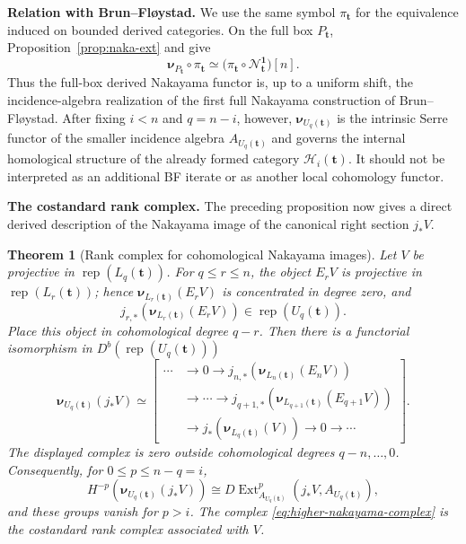 \documentclass[12pt,reqno]{amsart}
\newtheorem{theorem}{Theorem}[section]
\theoremstyle{definition}
\theoremstyle{remark}
\newcommand{\Rep}{\operatorname{rep}}
\newcommand{\Ext}{\operatorname{Ext}}
\begin{document}
\medskip\noindent\textbf{Relation with Brun--Fl\o ystad.}
We use the same symbol $\pi_{\mathbf t}$ for the equivalence induced on
bounded derived categories.  On the full box $P_{\mathbf t}$,
Proposition~\ref{prop:naka-ext} and \cite[Proposition~3.9]{BF} give
\begin{equation}\label{eq:BF-derived-nakayama-comparison}
\boldsymbol\nu_{P_{\mathbf t}}\circ\pi_{\mathbf t}
\simeq
\bigl(\pi_{\mathbf t}\circ\mathcal N_{\mathbf t}^{\mathbf1}\bigr)[n].
\end{equation}
Thus the full-box derived Nakayama functor is, up to a uniform shift, the
incidence-algebra realization of the first full Nakayama construction of
Brun--Fl\o ystad.  After fixing $i<n$ and $q=n-i$, however,
$\boldsymbol\nu_{U_q(\mathbf t)}$ is the intrinsic Serre functor of the
smaller incidence algebra $A_{U_q(\mathbf t)}$ and governs the internal
homological structure of the already formed category
$\mathcal H_i(\mathbf t)$.  It should not be interpreted as an additional BF
iterate or as another local cohomology functor.

\medskip\noindent\textbf{The costandard rank complex.}
The preceding proposition now gives a direct derived description of the
Nakayama image of the canonical right section $j_*V$.

\begin{theorem}[Rank complex for cohomological Nakayama images]\label{thm:higher-nakayama-rank-complex}
Let $V$ be projective in $\Rep(L_q(\mathbf t))$.  For $q\le r\le n$, the
object $E_rV$ is projective in $\Rep(L_r(\mathbf t))$; hence
$\boldsymbol\nu_{L_r(\mathbf t)}(E_rV)$ is concentrated in degree zero, and
\[
j_{r,*}\!\left(\boldsymbol\nu_{L_r(\mathbf t)}(E_rV)\right)
\in\Rep(U_q(\mathbf t)).
\]
Place this object in cohomological degree $q-r$.  Then there is a functorial
isomorphism in $D^b(\Rep(U_q(\mathbf t)))$
\begin{equation}\label{eq:higher-nakayama-complex}
\boxed{
\boldsymbol\nu_{U_q(\mathbf t)}(j_*V)
\simeq
\left[
\begin{aligned}
\cdots&\longrightarrow 0\longrightarrow
j_{n,*}\!\left(\boldsymbol\nu_{L_n(\mathbf t)}(E_nV)\right)\\
&\longrightarrow\cdots\longrightarrow
j_{q+1,*}\!\left(\boldsymbol\nu_{L_{q+1}(\mathbf t)}(E_{q+1}V)\right)\\
&\longrightarrow
j_*\!\left(\boldsymbol\nu_{L_q(\mathbf t)}(V)\right)
\longrightarrow 0\longrightarrow\cdots
\end{aligned}
\right].}
\end{equation}
The displayed complex is zero outside cohomological degrees
$q-n,\ldots,0$.  Consequently, for $0\le p\le n-q=i$,
\begin{equation}\label{eq:higher-nakayama-ext}
H^{-p}\!\left(\boldsymbol\nu_{U_q(\mathbf t)}(j_*V)\right)
\cong
D\Ext^p_{A_{U_q(\mathbf t)}}
\!\left(j_*V,A_{U_q(\mathbf t)}\right),
\end{equation}
and these groups vanish for $p>i$.  The complex
\eqref{eq:higher-nakayama-complex} is the costandard rank complex associated
with $V$.
\end{theorem}
\end{document}
